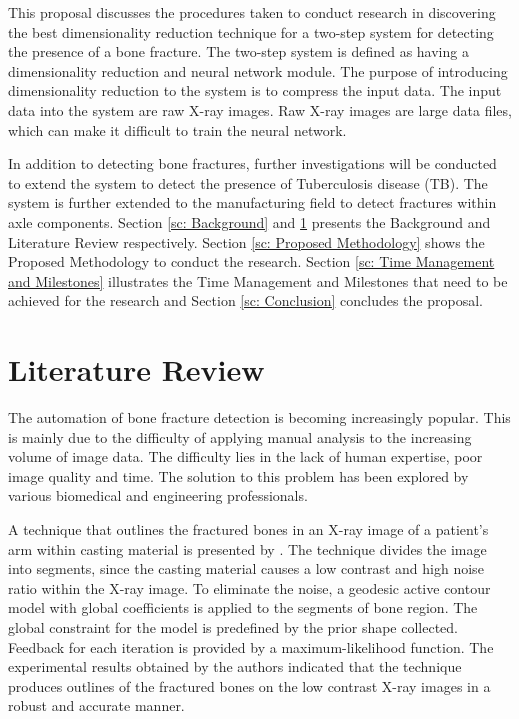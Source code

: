 \documentclass[11pt,twocolumn]{witseiepaper}
\begin{document}
	This proposal discusses the procedures taken to conduct research in discovering the best dimensionality reduction technique for a two-step system for detecting the presence of a bone fracture. The two-step system is defined as having a dimensionality reduction and neural network module. The purpose of introducing dimensionality reduction to the system is to compress the input data. The input data into the system are raw X-ray images. Raw X-ray images are large data files, which can make it difficult to train the neural network.
	
	In addition to detecting bone fractures, further investigations will be conducted to extend the system to detect the presence of Tuberculosis disease (TB). The system is further extended to the manufacturing field to detect fractures within axle components. Section \ref{sc: Background} and \ref{sc: Literature Review} presents the Background and Literature Review respectively. Section \ref{sc: Proposed Methodology} shows the Proposed Methodology to conduct the research. Section \ref{sc: Time Management and Milestones} illustrates the Time Management and Milestones that need to be achieved for the research and Section \ref{sc: Conclusion} concludes the proposal. 
	
	\section{Literature Review}
	\label{sc: Literature Review}
	The automation of bone fracture detection is becoming increasingly popular. This is mainly due to the difficulty of applying manual analysis to the increasing volume of image data. The difficulty lies in the lack of human expertise, poor image quality and time. The solution to this problem has been explored by various biomedical and engineering professionals. 
	
	A technique that outlines the fractured bones in an X-ray image of a patient's arm within casting material is presented by \cite{Jia_Jiang2006}. The technique divides the image into segments, since the casting material causes a low contrast and high noise ratio within the X-ray image. To eliminate the noise, a geodesic active contour model with global coefficients is applied to the segments of bone region. The global constraint for the model is predefined by the prior shape collected. Feedback for each iteration is provided by a maximum-likelihood function. The experimental results obtained by the authors indicated that the technique produces outlines of the fractured bones on the low contrast X-ray images in a robust and accurate manner.
	
\end{document}

